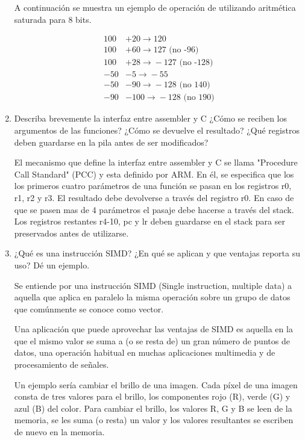 \documentclass[12pt, a4paper]{article}
\begin{document}
\begin{enumerate}
    A continuación se muestra un ejemplo de operación de utilizando aritmética saturada para 8 bits.
    
    \begin{equation}
    \begin{split}
    100 &+ 20 \rightarrow{} 120 \\
    100 &+ 60 \rightarrow{} 127 \,\, \text{(no -96)} \\
    100 &+ 28 \rightarrow{} -127  \,\,  \text{(no -128)} \\
    -50 &- 5 \rightarrow{} -55 \\
    -50 &- 90 \rightarrow{} -128  \,\,  \text{(no 140)} \\
    -90 &- 100 \rightarrow{} -128  \,\,  \text{(no 190)}
    \end{split}
    \end{equation}
    
    
    \item Describa brevemente la interfaz entre assembler y C ¿Cómo se reciben los argumentos de las 
    funciones? ¿Cómo se devuelve el resultado? ¿Qué registros deben guardarse en la pila 
    antes de ser modificados?
    
    El mecanismo que define la interfaz entre assembler y C se llama "Procedure Call Standard" (PCC) y 
    esta definido por ARM. En él, se especifica que los los primeros cuatro parámetros de una función 
    se pasan en los registros r0, r1, r2 y r3. El resultado debe devolverse a través del registro r0. 
    En caso de que se pasen mas de 4 parámetros el pasaje debe hacerse a través del stack. Los registros 
    restantes r4-10, pc y lr deben guardarse en el stack para ser preservados antes de utilizarse.
    
    \item¿Qué es una instrucción SIMD? ¿En qué se aplican y que ventajas reporta su uso? Dé un ejemplo.
    
    Se entiende por una instrucción SIMD (Single instruction, multiple data) a aquella que aplica en 
    paralelo la misma operación sobre un grupo de datos que comúnmente se conoce como vector.
    
    Una aplicación que puede aprovechar las ventajas de SIMD es aquella en la que el mismo valor 
    se suma a (o se resta de) un gran número de puntos de datos, una operación habitual en muchas 
    aplicaciones multimedia y de procesamiento de señales.
    
    Un ejemplo sería cambiar el brillo de una imagen. Cada píxel de una imagen consta de tres valores 
    para el brillo, los componentes rojo (R), verde (G) y azul (B) del color. Para cambiar el brillo, 
    los valores R, G y B se leen de la memoria, se les suma (o resta) un valor y los valores 
    resultantes se escriben de nuevo en la memoria.
    
\end{enumerate}
\end{document}
